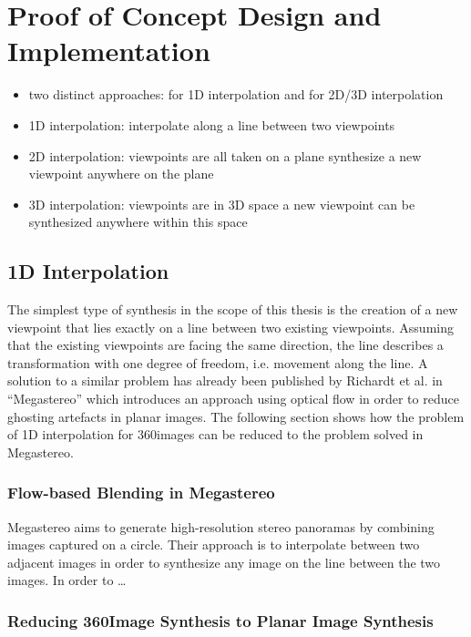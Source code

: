 \chapter{Proof of Concept Design and Implementation}
\begin{itemize}
\item two distinct approaches: for 1D interpolation and for 2D/3D interpolation
\item 1D interpolation: interpolate along a line between two viewpoints
\item 2D interpolation: viewpoints are all taken on a plane \ar synthesize a new viewpoint anywhere on the plane
\item 3D interpolation: viewpoints are in 3D space \ar a new viewpoint can be synthesized anywhere within this space
\end{itemize}

\section{1D Interpolation}
The simplest type of synthesis in the scope of this thesis is the creation of a new viewpoint that lies exactly on a line between two existing viewpoints. Assuming that the existing viewpoints are facing the same direction, the line describes a transformation with one degree of freedom, i.e. movement along the line. A solution to a similar problem has already been published by Richardt et al. in ``Megastereo'' \cite{megastereo} which introduces an approach using optical flow in order to reduce ghosting artefacts in planar images. The following section shows how the problem of 1D interpolation for 360\degree images can be reduced to the problem solved in Megastereo.

\subsection{Flow-based Blending in Megastereo}
Megastereo aims to generate high-resolution stereo panoramas by combining images captured on a circle. Their approach is to interpolate between two adjacent images in order to synthesize any image on the line between the two images. In order to \ldots

\subsection{Reducing 360\degree Image Synthesis to Planar Image Synthesis}

